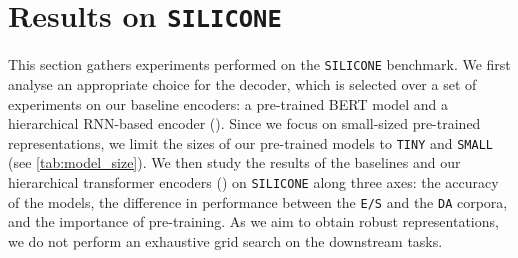 \documentclass[11pt,a4paper]{article}
\begin{document}
\section{Results on \texttt{SILICONE}}
This section gathers experiments performed on the \texttt{SILICONE} benchmark. 
We first analyse an appropriate choice for the decoder, which is selected over a set of experiments on our baseline encoders: a pre-trained BERT model and a hierarchical RNN-based encoder ().
Since we focus on small-sized pre-trained representations, we limit the sizes of our pre-trained models to \texttt{TINY} and \texttt{SMALL} (see \autoref{tab:model_size}). We then study the results of the baselines and our hierarchical transformer encoders () on \texttt{SILICONE} along three axes: the accuracy of the models, the difference in performance between the \texttt{E/S} and the \texttt{DA} corpora, and the importance of pre-training.
As we aim to obtain robust representations, we do not perform an exhaustive grid search on the downstream tasks.
\end{document}
